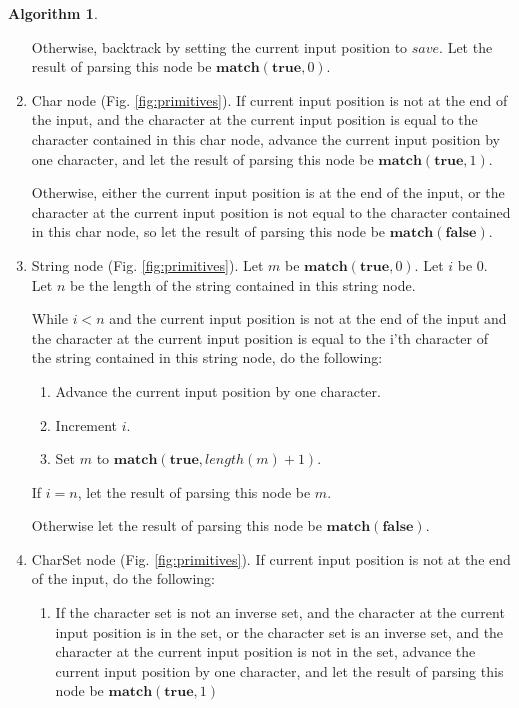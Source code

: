 \documentclass[a4paper,oneside,11pt]{book}
\theoremstyle{definition}
\newtheorem{algo}{Algorithm}[section]
\begin{document}
\begin{algo}
\begin{flushleft}
\begin{enumerate}
Otherwise, backtrack by setting the current input position to $save$.
Let the result of parsing this node be $\textbf{match}(\textbf{true}, 0)$.

\item
Char node (Fig. \ref{fig:primitives}). If current input position is not at the end of the input, and the
character at the current input position is equal to the character contained in this char node,
advance the current input position by one character, and let the result of parsing this node be
$\textbf{match}(\textbf{true}, 1)$.

Otherwise, either the current input position is at the end of the input,
or the character at the current input position is not equal to the character contained in this char node,
so let the result of parsing this node be $\textbf{match}(\textbf{false})$.

\item
String node (Fig. \ref{fig:primitives}). Let $m$ be $\textbf{match}(\textbf{true}, 0)$.
Let $i$ be 0. Let $n$ be the length of the string contained in this string node.

While $i < n$ and the current input position is not at the end of the input and
the character at the current input position is equal to the i'th character of the string contained in this string node,
do the following:
\begin{enumerate}
\item
Advance the current input position by one character.
\item
Increment $i$.
\item
Set $m$ to $\textbf{match}(\textbf{true}, length(m) + 1)$.
\end{enumerate}
If $i = n$, let the result of parsing this node be $m$.

Otherwise let the result of parsing this node be $\textbf{match}(\textbf{false})$.

\item
CharSet node (Fig. \ref{fig:primitives}).
If current input position is not at the end of the input, do the following:
\begin{enumerate}
\item
If the character set is not an inverse set, and the character at the current input position is in the set,
or the character set is an inverse set, and the character at the current input position is not in the set,
advance the current input position by one character,
and let the result of parsing this node be $\textbf{match}(\textbf{true}, 1)$
\end{enumerate}


\end{enumerate}
\end{flushleft}
\end{algo}
\end{document}
